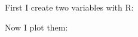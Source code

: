 \documentclass{report}
\begin{document}
First I create two variables with R:


Now I plot them:

\end{document}

